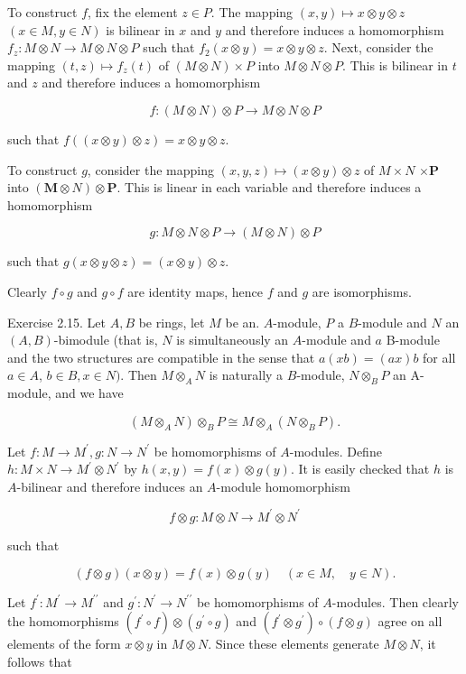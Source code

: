 \documentclass{standalone}
\theoremstyle{definition}
\theoremstyle{remark}
\begin{document}
To construct $f$, fix the element $z \in P$. The mapping $(x, y) \mapsto x \otimes y \otimes z$ $(x \in M, y \in N)$ is bilinear in $x$ and $y$ and therefore induces a homomorphism $f_{z}: M \otimes N \rightarrow M \otimes N \otimes P$ such that $f_{2}(x \otimes y)=x \otimes y \otimes z$. Next, consider the mapping $(t, z) \mapsto f_{z}(t)$ of $(M \otimes N) \times P$ into $M \otimes N \otimes P$. This is bilinear in $t$ and $z$ and therefore induces a homomorphism

\[
f:(M \otimes N) \otimes P \rightarrow M \otimes N \otimes P
\]

such that $f((x \otimes y) \otimes z)=x \otimes y \otimes z$.

To construct $g$, consider the mapping $(x, y, z) \mapsto(x \otimes y) \otimes z$ of $M \times N$ $\times \boldsymbol{P}$ into $(\boldsymbol{M} \otimes N) \otimes \boldsymbol{P}$. This is linear in each variable and therefore induces a homomorphism

\[
g: M \otimes N \otimes P \rightarrow(M \otimes N) \otimes P
\]

such that $g(x \otimes y \otimes z)=(x \otimes y) \otimes z$.

Clearly $f \circ g$ and $g \circ f$ are identity maps, hence $f$ and $g$ are isomorphisms.

Exercise 2.15. Let $A, B$ be rings, let $M$ be an. $A$-module, $P$ a $B$-module and $N$ an $(A, B)$-bimodule (that is, $N$ is simultaneously an $A$-module and $a$ B-module and the two structures are compatible in the sense that $a(x b)=(a x) b$ for all $a \in A$, $b \in B, x \in N)$. Then $M \otimes_{A} N$ is naturally a $B$-module, $N \otimes_{B} P$ an A-module, and we have

\[
\left(M \otimes_{A} N\right) \otimes_{B} P \cong M \otimes_{A}\left(N \otimes_{B} P\right) .
\]

Let $f: M \rightarrow M^{\prime}, g: N \rightarrow N^{\prime}$ be homomorphisms of $A$-modules. Define $h: M \times N \rightarrow M^{\prime} \otimes N^{\prime}$ by $h(x, y)=f(x) \otimes g(y)$. It is easily checked that $h$ is $A$-bilinear and therefore induces an $A$-module homomorphism

\[
f \otimes g: M \otimes N \rightarrow M^{\prime} \otimes N^{\prime}
\]

such that

\[
(f \otimes g)(x \otimes y)=f(x) \otimes g(y) \quad(x \in M, \quad y \in N) .
\]

Let $f^{\prime}: M^{\prime} \rightarrow M^{\prime \prime}$ and $g^{\prime}: N^{\prime} \rightarrow N^{\prime \prime}$ be homomorphisms of $A$-modules. Then clearly the homomorphisms $\left(f^{\prime} \circ f\right) \otimes\left(g^{\prime} \circ g\right)$ and $\left(f^{\prime} \otimes g^{\prime}\right) \circ(f \otimes g)$ agree on all elements of the form $x \otimes y$ in $M \otimes N$. Since these elements generate $M \otimes N$, it follows that
\end{document}
